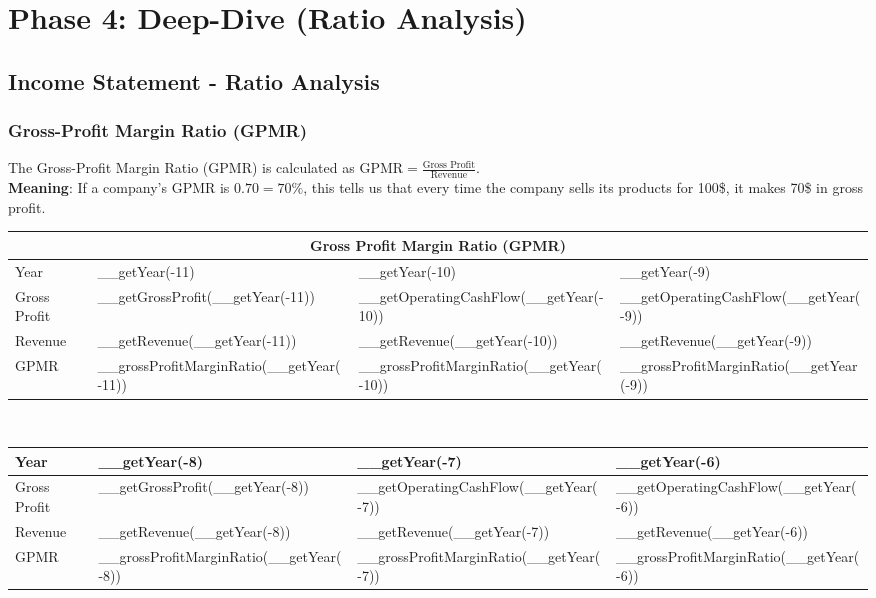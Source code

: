 \section{Phase 4: Deep-Dive (Ratio Analysis)}

\subsection{Income Statement - Ratio Analysis}

\subsubsection{Gross-Profit Margin Ratio (GPMR)}

The Gross-Profit Margin Ratio (GPMR) is calculated as
$\text{GPMR} = \frac{\text{Gross Profit}}{\text{Revenue}}$.\\
\textbf{Meaning}: If a company's GPMR is $0.70 = 70\%$, this tells us that every
time the company sells its products for 100\$, it makes 70\$ in gross profit.\\

\begin{tabularx}{\textwidth}{|X|X|X|X|}
 \hline
 \multicolumn{4}{|c|}{Gross Profit Margin Ratio (GPMR)} \\
 \hline
 Year                      & __getYear(-11)                           & __getYear(-10)                           & __getYear(-9)                           \\
 \hline
 Gross Profit              & __getGrossProfit(__getYear(-11))         & __getOperatingCashFlow(__getYear(-10))   & __getOperatingCashFlow(__getYear(-9))   \\
 Revenue                   & __getRevenue(__getYear(-11))             & __getRevenue(__getYear(-10))             & __getRevenue(__getYear(-9))             \\
 \rowcolor{lightgray} GPMR & __grossProfitMarginRatio(__getYear(-11)) & __grossProfitMarginRatio(__getYear(-10)) & __grossProfitMarginRatio(__getYear(-9)) \\
 \hline
\end{tabularx}\\

\begin{tabularx}{\textwidth}{|X|X|X|X|}
 \hline
 Year                      & __getYear(-8)                           & __getYear(-7)                           & __getYear(-6)                           \\
 \hline
 Gross Profit              & __getGrossProfit(__getYear(-8))         & __getOperatingCashFlow(__getYear(-7))   & __getOperatingCashFlow(__getYear(-6))   \\
 Revenue                   & __getRevenue(__getYear(-8))             & __getRevenue(__getYear(-7))             & __getRevenue(__getYear(-6))             \\
 \rowcolor{lightgray} GPMR & __grossProfitMarginRatio(__getYear(-8)) & __grossProfitMarginRatio(__getYear(-7)) & __grossProfitMarginRatio(__getYear(-6)) \\
 \hline
\end{tabularx}\\

